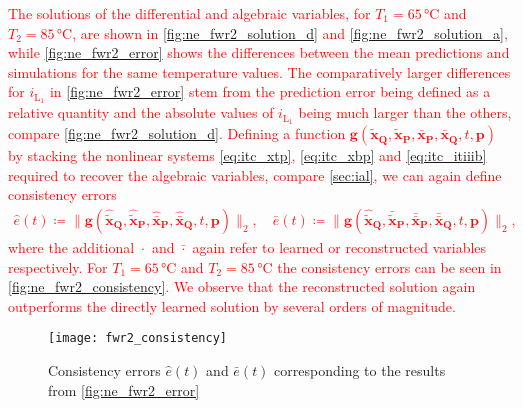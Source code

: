\documentclass[AMA,STIX1COL]{WileyNJD-v2}
\newcommand{\mb}[1]{\mathbf{#1}}
\newcommand{\mbt}[1]{\tilde{\mathbf{#1}}}
\newcommand{\mbb}[1]{\bar{\mathbf{#1}}}
\newcommand{\mr}[1]{\mathrm{#1}}
\begin{document}
\textcolor{red}{The solutions of the differential and algebraic variables, for $T_1 = 65\, \si{\celsius}$ and $T_2 = 85\, \si{\celsius}$, are shown in \autoref{fig:ne_fwr2_solution_d} and \autoref{fig:ne_fwr2_solution_a}, while \autoref{fig:ne_fwr2_error} shows the differences between the mean predictions and simulations for the same temperature values. The comparatively larger differences for $i_{\mr{L}_1}$ in \autoref{fig:ne_fwr2_error} stem from the prediction error being defined as a relative quantity and the absolute values of $i_{\mr{L}_1}$ being much larger than the others, compare \autoref{fig:ne_fwr2_solution_d}. Defining a function $\mb{g}(\mbt{x}_\mb{Q}, \mbt{x}_\mb{P}, \mbb{x}_\mb{P}, \mbb{x}_\mb{Q}, t, \mb{p})$ by stacking the nonlinear systems \eqref{eq:itc_xtp}, \eqref{eq:itc_xbp} and \eqref{eq:itc_itiiib} required to recover the algebraic variables, compare \autoref{sec:ial}, we can again define consistency errors
\begin{align*}
    \hat{e}(t) \coloneqq \big\| \mb{g}(\hat{\mbt{x}}_\mb{Q}, \hat{\mbt{x}}_\mb{P}, \hat{\mbb{x}}_\mb{P}, \hat{\mbb{x}}_\mb{Q}, t, \mb{p}) \big\|_2, \quad \bar{e}(t) \coloneqq \big\| \mb{g}(\hat{\mbt{x}}_\mb{Q}, \bar{\mbt{x}}_\mb{P}, \bar{\mbb{x}}_\mb{P}, \bar{\mbb{x}}_\mb{Q}, t, \mb{p}) \big\|_2,
\end{align*}
where the additional $\hat{\cdot}$ and $\bar{\cdot}$ again refer to learned or reconstructed variables respectively. For $T_1 = 65\, \si{\celsius}$ and $T_2 = 85\, \si{\celsius}$ the consistency errors can be seen in \autoref{fig:ne_fwr2_consistency}. We observe that the reconstructed solution again outperforms the directly learned solution by several orders of magnitude.}
\begin{figure}
    \begin{center}
        \texttt{[image: fwr2\_consistency]}
    \end{center}
    \caption{Consistency errors $\hat{e}(t)$ and $\bar{e}(t)$ corresponding to the results from \autoref{fig:ne_fwr2_error}}
    \label{fig:ne_fwr2_consistency}
\end{figure}
\end{document}
